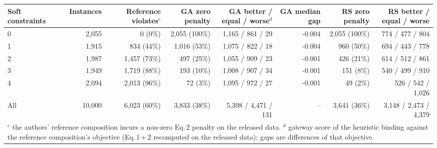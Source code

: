 \begin{tabular}{lrrrrrrr}
\toprule
Soft constraints & Instances & Reference violates$^{c}$ & GA zero penalty & GA better / equal / worse$^{d}$ & GA median gap & RS zero penalty & RS better / equal / worse \\
\midrule
0 & 2,055 & 0 (0\%) & 2,055 (100\%) & 1,165 / 861 / 29 & -0.004 & 2,055 (100\%) & 774 / 477 / 804 \\
1 & 1,915 & 834 (44\%) & 1,016 (53\%) & 1,075 / 822 / 18 & -0.004 & 960 (50\%) & 694 / 443 / 778 \\
2 & 1,987 & 1,457 (73\%) & 497 (25\%) & 1,055 / 909 / 23 & -0.001 & 426 (21\%) & 614 / 512 / 861 \\
3 & 1,949 & 1,719 (88\%) & 193 (10\%) & 1,008 / 907 / 34 & -0.001 & 151 (8\%) & 540 / 499 / 910 \\
4 & 2,094 & 2,013 (96\%) & 72 (3\%) & 1,095 / 972 / 27 & -0.001 & 49 (2\%) & 526 / 542 / 1,026 \\
\midrule
All & 10,000 & 6,023 (60\%) & 3,833 (38\%) & 5,398 / 4,471 / 131 & -- & 3,641 (36\%) & 3,148 / 2,473 / 4,379 \\
\bottomrule
\multicolumn{8}{p{0.95\linewidth}}{\footnotesize $^{c}$ the authors' reference composition incurs a non-zero Eq.\,2 penalty on the released data. $^{d}$ gateway score of the heuristic binding against the reference composition's objective (Eq.\,1\,+\,2 recomputed on the released data); gaps are differences of that objective.}
\end{tabular}
